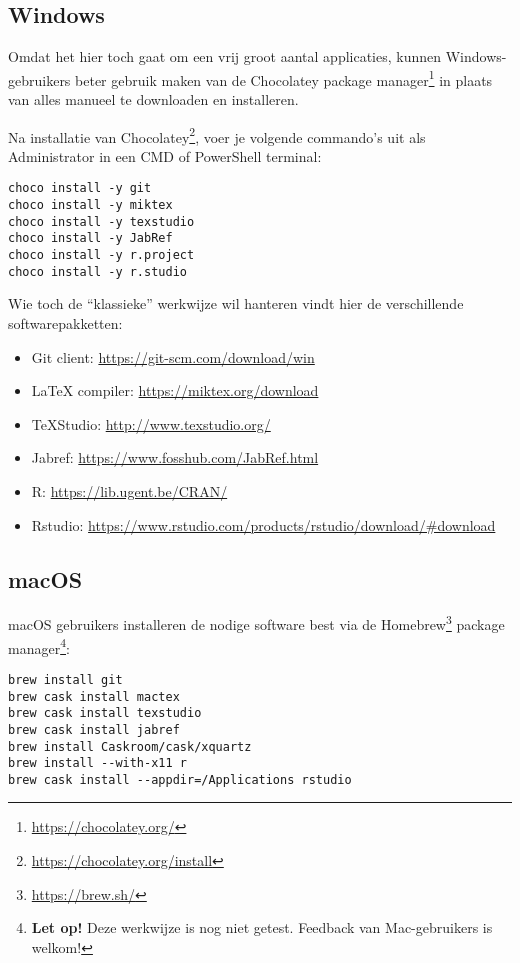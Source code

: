 \subsection{Windows}

Omdat het hier toch gaat om een vrij groot aantal applicaties, kunnen Windows-gebruikers beter gebruik maken van de Chocolatey package manager\footnote{\url{https://chocolatey.org/}} in plaats van alles manueel te downloaden en installeren.

Na installatie van Chocolatey\footnote{\url{https://chocolatey.org/install}}, voer je volgende commando's uit als Administrator in een CMD of PowerShell terminal:

\begin{verbatim}
choco install -y git
choco install -y miktex
choco install -y texstudio
choco install -y JabRef
choco install -y r.project
choco install -y r.studio
\end{verbatim}

Wie toch de ``klassieke'' werkwijze wil hanteren vindt hier de verschillende softwarepakketten:

\begin{itemize}
  \item Git client: \url{https://git-scm.com/download/win}
  \item \LaTeX{} compiler: \url{https://miktex.org/download}
  \item TeXStudio: \url{http://www.texstudio.org/}
  \item Jabref: \url{https://www.fosshub.com/JabRef.html}
  \item R: \url{https://lib.ugent.be/CRAN/}
  \item Rstudio: \url{https://www.rstudio.com/products/rstudio/download/#download}
\end{itemize}

\subsection{macOS}

macOS gebruikers installeren de nodige software best via de Homebrew\footnote{\url{https://brew.sh/}} package manager\footnote{\textbf{Let op!} Deze werkwijze is nog niet getest. Feedback van Mac-gebruikers is welkom!}:

\begin{verbatim}
brew install git
brew cask install mactex
brew cask install texstudio
brew cask install jabref
brew install Caskroom/cask/xquartz
brew install --with-x11 r
brew cask install --appdir=/Applications rstudio
\end{verbatim}


